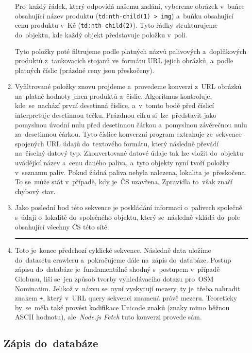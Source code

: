 \begin{enumerate}
        Pro~každý řádek, který odpovídá našemu zadání, vybereme obrázek
        v~buňce obsahující název produktu (\texttt{td:nth-child(1) > img})
        a~buňku obsahující cenu produktu v~Kč (\texttt{td:nth-child(2)}).
        Tyto řádky strukturujeme do~objektu, kde každý objekt představuje
        položku v~poli.

        Tyto položky poté filtrujeme podle platných názvů palivových
        a~doplňkových produktů z~tankovacích stojanů ve~formátu URL jejich
        obrázků, a~podle platných číslic (prázdné ceny jsou přeskočeny).
    \item Vyfiltrované položky znovu projdeme a~provedeme konverzi
        z~URL obrázků na~platné hodnoty jmen produktů a~číslic. Algoritmus
        kontroluje, kde~se~nachází první desetinná číslice, a~v~tomto bodě
        před číslicí interpretuje desetinnou tečku. Prázdnou cifru
        si~lze~představit jako pomyslnou úvodní nulu před desetinnou čárkou
        a~pomyslnou závěrečnou nulu za~desetinnou čárkou. Tyto číslice
        konverzní program extrahuje ze~sekvence spojených URL údajů
        do~textového formátu, který následně převádí na~číselný datový typ.
        Zkonvertované datové údaje tak lze vložit do~objektu uvádějící název
        a~cenu daného paliva, a~tyto objekty nyní tvoří položky v~seznamu
        paliv. Pokud žádná paliva nebyla nalezena, lokalita je~přeskočena.
        To se~může stát v~případě, kdy je~ČS uzavřena. Zpravidla to~však
        značí chybový stav.
    \item Jako poslední bod této sekvence je poskládání informací o~palivech
        společně s~údaji o~lokalitě do~společného objektu, který se~následně
        vkládá do~pole obsahující všechny ČS této sítě.
        \medskip    \hrule
    \item Toto je~konec předchozí cyklické sekvence. Následně data uložíme
        do~datasetu crawleru a~pokračujeme dále na~zápis do~databáze.
        Postup zápisu do~databáze je~fundamentálně shodný s~postupem
        v~případě Globusu, liší se~jen způsob tvorby vyhledávacího dotazu
        pro~OSM Nominatim. Jelikož v~názvu se~nyní vyskytují mezery,
        ty je~třeba nahradit znakem \texttt{+}, který v~URL query sekvenci
        znamená právě mezeru. Teoreticky by~se~měla také provést kodifikace
        Unicode znaků (znaky mimo běžnou ASCII hodnotu), ale~\emph{Node.js
        Fetch} tuto konverzi provede sám.
\end{enumerate}

\subsection{Zápis do~databáze}
\label{sec:writing-to-db}


